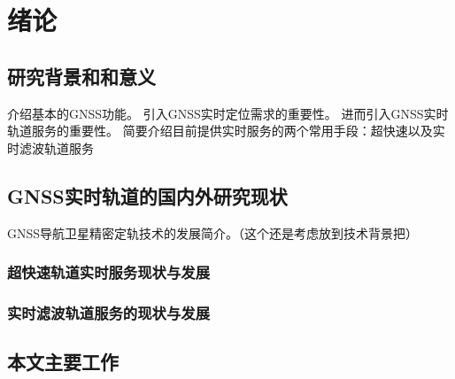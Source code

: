 
\chapter{绪论}

\section{研究背景和和意义}
介绍基本的GNSS功能。
引入GNSS实时定位需求的重要性。
进而引入GNSS实时轨道服务的重要性。
简要介绍目前提供实时服务的两个常用手段：超快速以及实时滤波轨道服务
\section{GNSS实时轨道的国内外研究现状}
GNSS导航卫星精密定轨技术的发展简介。（这个还是考虑放到技术背景把）
\subsection{超快速轨道实时服务现状与发展}

\subsection{实时滤波轨道服务的现状与发展}

\section{本文主要工作}